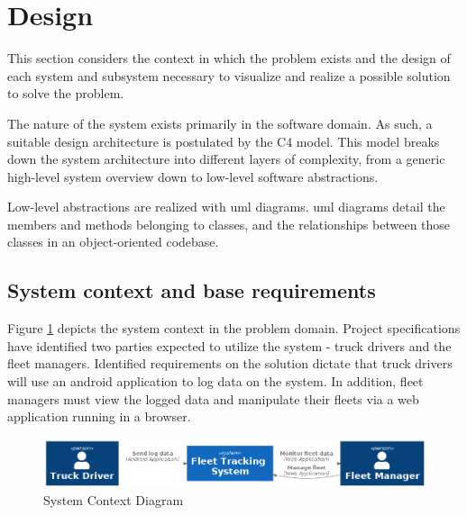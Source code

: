 \section{Design}
This section considers the context in which the problem exists and the design of each system and subsystem necessary to visualize and realize a possible solution to solve the problem.

The nature of the system exists primarily in the software domain.
As such, a suitable design architecture is postulated by the C4 model.
This model breaks down the system architecture into different layers of complexity, from a generic high-level system overview down to low-level software abstractions.\cite{vazquez2020c4}

Low-level abstractions are realized with \ac{uml} diagrams. \Ac{uml} diagrams detail the members and methods belonging to classes, and the relationships between those classes in an object-oriented codebase. \cite{petre2013uml}

\subsection{System context and base requirements }
Figure \ref{fig:system_context} depicts the system context in the problem domain.
Project specifications have identified two parties expected to utilize the system - truck drivers and the fleet managers.
Identified requirements on the solution dictate that truck drivers will use an android application to log data on the system.
In addition, fleet managers must view the logged data and manipulate their fleets via a web application running in a browser.

\begin{figure}[H]
\centering
\includegraphics[width=6in]{../diag/system_context.png}
\caption{System Context Diagram}
\label{fig:system_context}
\end{figure}

